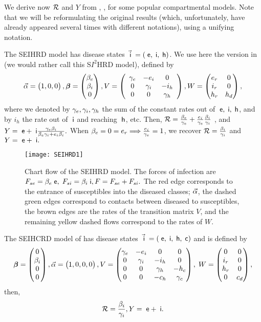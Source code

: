 {We derive now $\mathcal R$ and $Y$ from ,  , for some  popular compartmental models.} Note that we will be  reformulating the original results (which, unfortunately,  have already appeared several times with different notations), using  a
unifying notation.

\beXa The SEIHRD model  \cite{ivorra2017stability,Palmer,pazos2020control,nave2020theta,ramos2021simple} has disease states $\vec {\;\mathsf i} \;  =(\;\mathsf e , \;\mathsf i, \; \mathsf h)$. We use here  the version in  \cite{pazos2020control} (we would rather call this S$I^2$HRD model),   defined by $$\vec \alpha=\begin{pmatrix} 1,0,0\end{pmatrix}, {\mbox{\boldmath$\beta$}}=\begin{pmatrix} \beta_e\\\beta_i\\0\end{pmatrix}, V=\left(\begin{array}{ccc}
 \gamma_e  & -e_i  & 0 \\
 0 & \gamma_i  & -i_h \\
 0 & 0 & \gamma_h \\
\end{array}
\right), W =\begin{pmatrix} e_r&0\\i_r&0\\h_r&h_d \end{pmatrix},
$$ where we denoted by $\gamma_e,\gamma_i, \gamma_h$ the sum of the constant rates out of $\;\mathsf e, \;\mathsf i, \; \mathsf h$, and by $i _h$ the rate out of $\;\mathsf i$ and reaching $\; \mathsf h$, etc. Then, $\mathcal R=\frac {\beta_e}{\gamma_e}+ \frac {e_i }{\gamma_e  } \frac { \beta_i}{\gamma_i }$ \cite[2]{pazos2020control}, %
and $ Y=\;\mathsf e+\;\mathsf i \frac{ \gamma _e \beta _i}{\beta _e \gamma _i+e_i \beta _i}.$  When $\beta_e=0=e_r \Longrightarrow \frac{e_i}{\gamma_e} =1$, we recover $\mathcal R=\frac {\beta_i}{\gamma_i}$ \cite{Palmer} and $ Y=\;\mathsf e+\;\mathsf i.$

\begin{figure}[H]
\centering
\texttt{[image: SEIHRD1]}
\caption{Chart flow of the SEIHRD model. The forces of infection  are $F_{se}= \beta_e \;\mathsf e,\; F_{si}= \beta_i \;\mathsf i  , F=F_{se}+F_{si}.$
The red edge corresponds to the entrance of susceptibles into the diseased classes; $\vec \alpha$, the dashed green edges correspond to contacts between  diseased to susceptibles, the brown edges are the rates of the transition matrix $V$, and the remaining yellow dashed flows correspond to the rates of $W$. \label{f:SEIHRD}}
\end{figure}
\eeXa
\beXa The SEIHCRD model of \cite{Kantner} has disease states $\vec {\;\mathsf i} \;  =(\;\mathsf e , \;\mathsf i, \; \mathsf h, \; \mathsf c)$ and is defined by $$\bb=\bep 0\\\b_i\\0\\0\eep, \va=\bep 1,0,0,0\eep, V=
\bep
 \g_e  & -e_i &0  & 0 \\
 0 & \g_i  &-i_h& 0 \\
 0 & 0& \g_h &-h_c \\
 0 & 0 &-c_h& \g_c \\
\eep , \; W =\bep 0&0\\i_r&0\\h_r&0 \\
0 & c_d\eep%
,$$
then,
$$ \mathcal R=\frac{\beta_i}{ \gamma _i}, Y=\;\mathsf e+\;\mathsf i.$$


